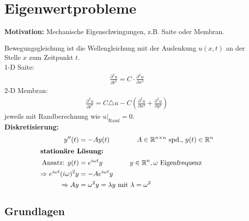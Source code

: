 \documentclass[%
a4paper,
11pt,		%
]
{scrartcl}
\theoremstyle{plain}
\theoremstyle{plain}
\theoremstyle{plain}
\theoremstyle{plain}
\begin{document}
\setcounter{section}{6}

\section{Eigenwertprobleme}
\label{sec:Eigenwertprobleme}

\textbf{Motivation:} Mechanische Eigenschwingungen, z.B. Saite oder Membran.

Bewegungsgleichung ist die Wellengleichung mit der Auslenkung $u(x,t)$ an der Stelle $x$ zum Zeitpunkt $t$.\\

1-D Saite:
\begin{align*}
\frac{\partial^2 u}{\partial t^2} = C \cdot \frac{\partial^2 u}{\partial x^2}
\end{align*}
2-D Membran:
\begin{align*}
\frac{\partial^2 u}{\partial t^2} = C \triangle u - C \left( \frac{\partial^2 u}{\partial x^2} + \frac{\partial^2 u}{\partial y^2} \right)
\end{align*}
jeweils mit Randberechnung wie $\left. u \right|_{\text{Rand}}=0$.\\

\textbf{Diskretisierung:}
\begin{align*}
  y''(t) & = -Ay(t) \qquad\qquad  A \in \mathbb{R}^{n \times n} \text{ spd., } y(t) \in \mathbb{R}^n\\
  \intertext{\textbf{stationäre Lösung:}}
  \text{Ansatz: } y(t) & = e^{i \omega t} y \qquad \qquad y \in \mathbb{R}^n, \omega \text{ Eigenfrequenz}\\
  \Rightarrow e^{i \omega t} (i \omega)^2 y & = -A e^{i \omega t} y\\
  \Rightarrow Ay & = \omega^2 y = \lambda y \text{ mit } \lambda = \omega^2
\end{align*}

\subsection{Grundlagen} %
\label{sub:Grundlagen}
\end{document}
